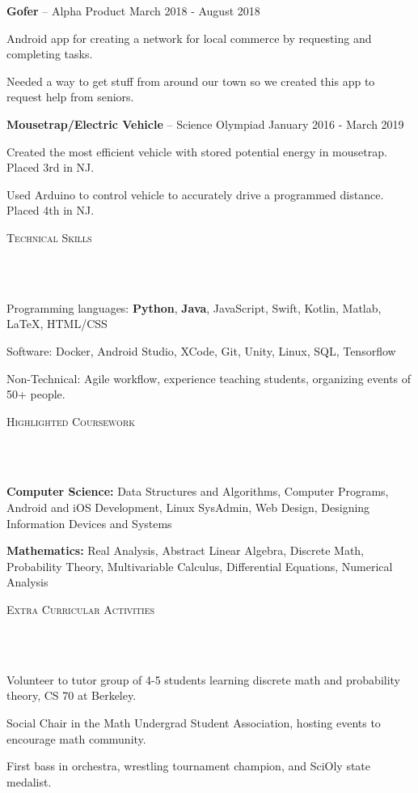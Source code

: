 \documentclass{article}
\newcommand{\header}[1]{{
\hspace*{-15pt}\vspace*{6pt} \textsc{#1}} \vspace*{-6pt} 
\lineunder
}
\newcommand{\lineunder}{
\vspace*{-8pt} \\ \hspace*{-18pt} 
\hrulefill \\
}
\newcommand{\project}[3]{{
\vspace*{2pt}%
\textbf{#1} #2 \hfill #3\vspace*{2pt}}
}
\renewcommand{\labelitemii}{
$\vcenter{\hbox{\tiny$\bullet$}}$\hspace*{-3pt}
}
\newenvironment{bullet-list-major}{
\begin{list}{\labelitemii}{\setlength\leftmargin{3pt} 
\topsep 0pt \itemsep -2pt}}{\vspace*{4pt}\end{list}
}
\newenvironment{bullet-list-minor}{
\begin{list}{\labelitemii}{\setlength\leftmargin{15pt} 
\topsep 0pt \itemsep -2pt}}{\vspace*{4pt}\end{list}
}
\begin{document}
    \project{Gofer}{ -- Alpha Product}{ March 2018 - August 2018}
    \begin{bullet-list-minor}
    \item Android app for creating a network for local commerce by requesting and completing tasks.
    \item Needed a way to get stuff from around our town so we created this app to request help from seniors. 
    \end{bullet-list-minor}

    \project{Mousetrap/Electric Vehicle}{ -- Science Olympiad}{ January 2016 - March 2019}
    \begin{bullet-list-minor}
    \item Created the most efficient vehicle with stored potential energy in mousetrap. Placed 3rd in NJ. 
    \item Used Arduino to control vehicle to accurately drive a programmed distance. Placed 4th in NJ. 
    \end{bullet-list-minor}
	
\vspace*{4pt}%
\header{Technical Skills}
    \begin{bullet-list-major}
    \item Programming languages: \textbf{Python}, \textbf{Java}, JavaScript, Swift, Kotlin, Matlab, LaTeX, HTML/CSS
    \item Software: Docker, Android Studio, XCode, Git, Unity, Linux, SQL, Tensorflow 
    \item Non-Technical: Agile workflow, experience teaching students, organizing events of 50+ people.
    \end{bullet-list-major}

\vspace*{4pt}%
\header{Highlighted Coursework}
    \begin{bullet-list-major}
    \item \textbf{Computer Science:} Data Structures and Algorithms, Computer Programs, Android and iOS Development, Linux SysAdmin, Web Design, Designing Information Devices and Systems
    \item \textbf{Mathematics:} Real Analysis, Abstract Linear Algebra, Discrete Math, Probability Theory, Multivariable Calculus, Differential Equations, Numerical Analysis
    \end{bullet-list-major}

\vspace*{4pt}%
\header{Extra Curricular Activities}
    \begin{bullet-list-major}
    \item Volunteer to tutor group of 4-5 students learning discrete math and probability theory, CS 70 at Berkeley. 
    \item Social Chair in the Math Undergrad Student Association, hosting events to encourage math community.
    \item First bass in orchestra, wrestling tournament champion, and SciOly state medalist.
    \end{bullet-list-major}
\end{document}
